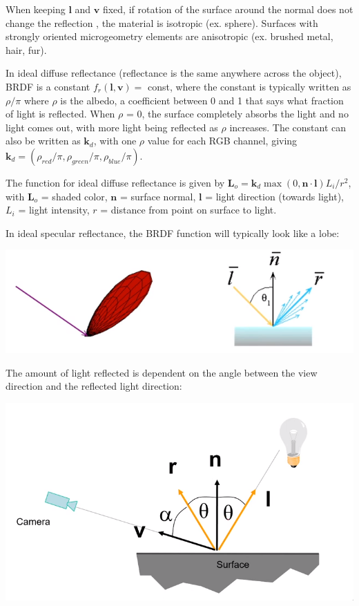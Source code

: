 \documentclass[12pt]{article}
\begin{document}
When keeping $\bm l$ and $\bm v$ fixed, if rotation of the surface
around the normal does not change the reflection , the material is
isotropic (ex. sphere). Surfaces with strongly oriented microgeometry elements
are anisotropic (ex. brushed metal, hair, fur).

In ideal diffuse reflectance (reflectance is the same anywhere across
the object), BRDF is a constant $f_r(\bm l,\bm v) = $ const, where the
constant is typically written as $\rho/\pi$ where $\rho$ is the
albedo, a coefficient between 0 and 1 that says what fraction
of light is reflected. When $\rho$ = 0, the surface completely
absorbs the light and no light comes out, with more light being
reflected as $\rho$ increases. The constant can also be written
as $\bm k_d$, with one $\rho$ value for each RGB channel, giving
$\bm k_d = (\rho_{red}/\pi,\rho_{green}/\pi,\rho_{blue}/\pi)$.

The function for ideal diffuse reflectance is given by
$\bm L_o = \bm k_d \max(0,\bm n \cdot \bm l) L_i/r^2$,
with $\bm L_o$ = shaded color, $\bm n$ = surface normal,
$\bm l$ = light direction (towards light), $L_i$ = light intensity,
$r$ = distance from point on surface to light.

In ideal specular reflectance, the BRDF function will typically look
like a lobe:

\includegraphics[scale=.6]{images/specular-brdf.png}

The amount of light reflected is dependent on the angle between
the view direction and the reflected light direction:

\includegraphics[scale=.5]{images/brdf-specular-reflectance.png}
\end{document}
